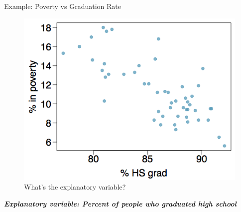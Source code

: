 \documentclass[
  ignorenonframetext,
]{beamer}
\begin{document}
\begin{frame}{Example: Poverty vs Graduation Rate}
\label{example-poverty-vs-graduation-rate-1}
\begin{figure}[H]

{\centering \includegraphics{class31_files/mediabag/poverty-vs-grad-rate.png}

}

\caption{What's the explanatory variable?}

\end{figure}%

\pause

\textbf{\emph{Explanatory variable: Percent of people who graduated high
school}}
\end{frame}
\end{document}
